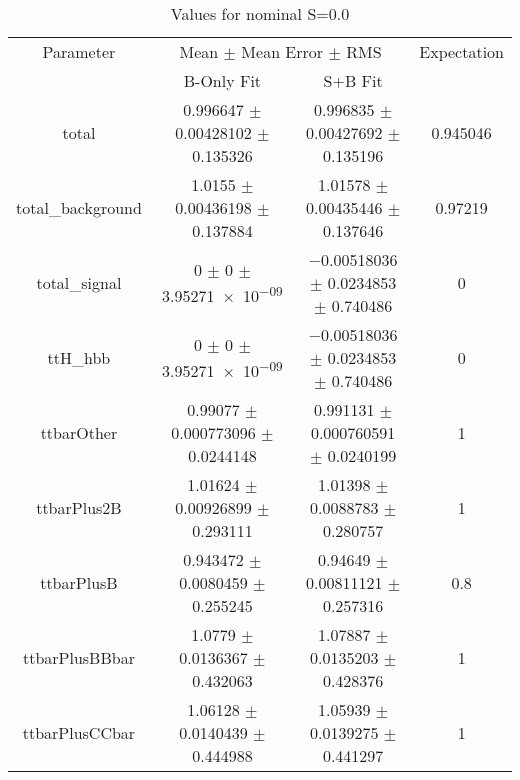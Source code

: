 \begin{table}
\centering
\caption{Values for nominal S=0.0}
\begin{tabular}{cccc}
\toprule
Parameter & \multicolumn{2}{c}{Mean $\pm$ Mean Error $\pm$ RMS} & Expectation\\
 & B-Only Fit & S+B Fit & \\
\midrule
total & \num{0.996647} $\pm$ \num{0.00428102} $\pm$ \num{0.135326} & \num{0.996835} $\pm$ \num{0.00427692} $\pm$ \num{0.135196} & \num{0.945046}\\
total\_background & \num{1.0155} $\pm$ \num{0.00436198} $\pm$ \num{0.137884} & \num{1.01578} $\pm$ \num{0.00435446} $\pm$ \num{0.137646} & \num{0.97219}\\
total\_signal & \num{0} $\pm$ \num{0} $\pm$ \num{3.95271e-09} & \num{-0.00518036} $\pm$ \num{0.0234853} $\pm$ \num{0.740486} & \num{0}\\
ttH\_hbb & \num{0} $\pm$ \num{0} $\pm$ \num{3.95271e-09} & \num{-0.00518036} $\pm$ \num{0.0234853} $\pm$ \num{0.740486} & \num{0}\\
ttbarOther & \num{0.99077} $\pm$ \num{0.000773096} $\pm$ \num{0.0244148} & \num{0.991131} $\pm$ \num{0.000760591} $\pm$ \num{0.0240199} & \num{1}\\
ttbarPlus2B & \num{1.01624} $\pm$ \num{0.00926899} $\pm$ \num{0.293111} & \num{1.01398} $\pm$ \num{0.0088783} $\pm$ \num{0.280757} & \num{1}\\
ttbarPlusB & \num{0.943472} $\pm$ \num{0.0080459} $\pm$ \num{0.255245} & \num{0.94649} $\pm$ \num{0.00811121} $\pm$ \num{0.257316} & \num{0.8}\\
ttbarPlusBBbar & \num{1.0779} $\pm$ \num{0.0136367} $\pm$ \num{0.432063} & \num{1.07887} $\pm$ \num{0.0135203} $\pm$ \num{0.428376} & \num{1}\\
ttbarPlusCCbar & \num{1.06128} $\pm$ \num{0.0140439} $\pm$ \num{0.444988} & \num{1.05939} $\pm$ \num{0.0139275} $\pm$ \num{0.441297} & \num{1}\\
\bottomrule
\end{tabular}
\end{table}